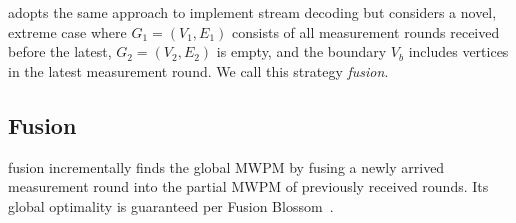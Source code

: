 \arch adopts the same approach to implement stream decoding but considers a novel, extreme case where $G_1=(V_1,E_1)$ consists of all measurement rounds received before the latest, $G_2=(V_2,E_2)$ is empty, and the boundary $V_b$ includes vertices in the latest measurement round. We call this strategy \emph{\round fusion}.

\subsection{\Round Fusion}\label{ssec:round-wise-fusion}
\Round fusion incrementally finds the global MWPM by fusing a newly arrived measurement round into the partial MWPM of previously received rounds.
Its global optimality is guaranteed per Fusion Blossom~\cite{wu2023qce}.

\begin{comment}
\begin{figure*}[t]
    \centering
    \subfloat[$t = \qty{1}{\mu s}$]{\texttt{[image: figures/web-plot/fusion-process/fusion\_demo\_1.png]}}
    \hfill
    \subfloat[$t = \qty{2}{\mu s}$]{\texttt{[image: figures/web-plot/fusion-process/fusion\_demo\_3.png]}}
    \hfill
    \subfloat[$t = \qty{3}{\mu s}$]{\texttt{[image: figures/web-plot/fusion-process/fusion\_demo\_5.png]}}
    \hfill
    \subfloat[$t = \qty{4}{\mu s}$]{\texttt{[image: figures/web-plot/fusion-process/fusion\_demo\_7.png]}}
    \hfill
    \subfloat[$t = \qty{5}{\mu s}$]{\texttt{[image: figures/web-plot/fusion-process/fusion\_demo\_9.png]}}
    \hfill
    \subfloat[MWPM]{\texttt{[image: figures/web-plot/fusion-process/fusion\_demo\_10.png]}}
    \caption{An example of stream decoding based on \round fusion. (a) It starts with the first measurement round $G_1$ and the second measurement round as the boundary (blue). 
    \lina{What is G1 in (a)? the red vertices are defect? If so, G1 also includes a round?}
    \lin{What are the red edges and green edges in (a)? How do they change in (b)?}
    \lin{The rest of the caption explains fusion. IMHO, this is not necessary. Instead, you should use (b) to (f) to explain the round-wise fusion process.}
    When fusing a measurement round, we first load the defects and then recover the boundary vertices as regular vertices. The Covers evolve as new measurements come, but it is statistically unlikely to affect the Covers away from the fusion boundary. One can imagine that the ``active'' region of the decoder is only a few measurement rounds near the fusion boundary, although in the worst case it can still update the whole decoding graph.
    }
    \label{fig:fusion-process}
\end{figure*}
\end{comment}


